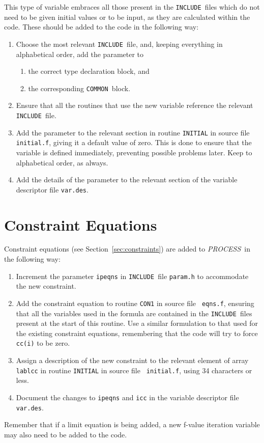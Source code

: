 \documentclass[11pt,a4paper]{report}
\newcommand{\PS}{\mbox{\it PROCESS\/ }}
\newcommand{\INCLUDE}{\mbox{\tt INCLUDE }}
\newcommand{\COMMON}{\mbox{\tt COMMON }}
\begin{document}
This type of variable embraces all those present in the \INCLUDE files
which do not need to be given initial values or to be input, as they
are calculated within the code. These should be added to the code in
the following way:
\begin{enumerate}
\item
Choose the most relevant \INCLUDE file, and, keeping everything in
alphabetical order, add the parameter to
\begin{enumerate}
\item
the correct type declaration block, and
\item
the corresponding \COMMON block.
\end{enumerate}
\item
Ensure that all the routines that use the new variable reference the
relevant \INCLUDE file.
\item
Add the parameter to the relevant section in routine {\tt INITIAL} in
source file {\tt initial.f}, giving it a default value of zero. This
is done to ensure that the variable is defined immediately, preventing
possible problems later. Keep to alphabetical order, as always.
\item
Add the details of the parameter to the relevant section of the
variable descriptor file {\tt var.des}.
\end{enumerate}

\section{Constraint Equations}

Constraint equations (see Section~\ref{sec:constraints}) are added to
\PS in the following way:
\begin{enumerate}
\item
Increment the parameter {\tt ipeqns} in \INCLUDE file {\tt param.h} to
accommodate the new constraint.
\item
Add the constraint equation to routine {\tt CON1} in source file {\tt
eqns.f}, ensuring that all the variables used in the formula are
contained in the \INCLUDE files present at the start of this routine.
Use a similar formulation to that used for the existing constraint
equations, remembering that the code will try to force {\tt cc(i)} to
be zero.
\item
Assign a description of the new constraint to the relevant element of
array {\tt lablcc} in routine {\tt INITIAL} in source file {\tt
initial.f}, using 34 characters or less.
\item
Document the changes to {\tt ipeqns} and {\tt icc} in the variable
descriptor file {\tt var.des}.
\end{enumerate}
Remember that if a limit equation is being added, a new f-value
iteration variable may also need to be added to the code.
\end{document}

